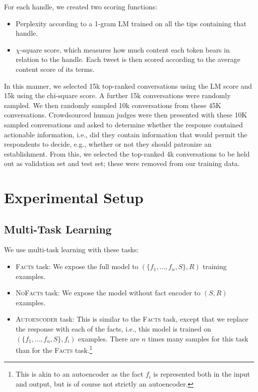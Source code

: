 \documentclass[letterpaper]{article}
\begin{document}
For each handle, we created two scoring functions:
\begin{itemize}
\item{Perplexity according to a 1-gram LM trained on all the tips containing that handle.}
\item{$\chi$-square score, which measures how much content each token bears in relation to the handle. Each tweet is then scored according to the average content score of its terms.}
\end{itemize}
In this manner, we selected 15k top-ranked conversations using the LM score and 15k using the chi-square score.
A further 15k conversations were randomly sampled.
We then randomly sampled 10k conversations from these 45K conversations.
Crowdsourced human judges were then presented with these 10K sampled conversations and asked to determine whether the response contained actionable information, i.e., did they contain information that would permit the respondents to decide, e.g., whether or not they should patronize an establishment.
From this, we selected the top-ranked 4k conversations to be held out as validation set and test set; these were removed from our training data.

\section{Experimental Setup}

\subsection{Multi-Task Learning}

We use multi-task learning with these tasks:
\begin{itemize}
    \item \textsc{Facts} task: We expose the full model to $(\{f_1,...,f_n,S\},R)$ training examples.
    \item \textsc{NoFacts} task: We expose the model without fact encoder to $(S,R)$ examples.
    \item \textsc{Autoencoder} task: This is similar to the \textsc{Facts} task, except that we replace the response with each of the facts, i.e., this model is trained on $(\{f_1,...,f_n,S\},f_i)$ examples.
    There are $n$ times many samples for this task than for the \textsc{Facts} task.\footnote{This is akin to an autoencoder as the fact $f_i$ is represented both in the input and output, but is of course not strictly an autoencoder.}
\end{itemize}
\end{document}
